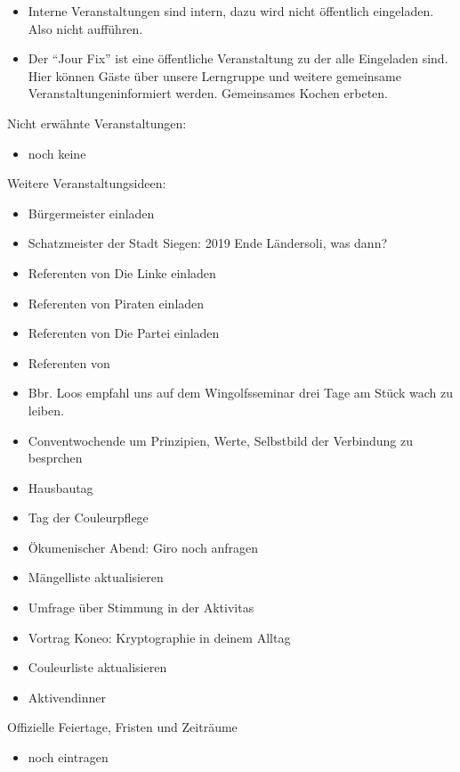%
% 


\begin{itemize}
\item Interne Veranstaltungen sind intern, dazu wird nicht öffentlich eingeladen. Also nicht aufführen.
\item Der \enquote{Jour Fix} ist eine öffentliche Veranstaltung zu der alle Eingeladen sind. Hier können Gäste über unsere Lerngruppe und weitere gemeinsame Veranstaltungeninformiert werden. Gemeinsames Kochen erbeten.
\end{itemize}

Nicht erwähnte Veranstaltungen:
\begin{itemize}
	\item noch keine
\end{itemize}

Weitere Veranstaltungsideen:
\begin{itemize}
	\item Bürgermeister einladen
	\item Schatzmeister der Stadt Siegen: 2019 Ende Ländersoli, was dann?
	\item Referenten von Die Linke einladen
	\item Referenten von Piraten einladen
	\item Referenten von Die Partei einladen
	\item Referenten von 
	\item Bbr. Loos empfahl uns auf dem Wingolfsseminar drei Tage am Stück wach zu leiben. 
	\item Conventwochende um Prinzipien, Werte, Selbstbild der Verbindung zu besprchen
	\item Hausbautag
	\item Tag der Couleurpflege
	\item Ökumenischer Abend: Giro noch anfragen
	\item Mängelliste aktualisieren
	\item Umfrage über Stimmung in der Aktivitas
	\item Vortrag Koneo: Kryptographie in deinem Alltag
	\item Couleurliste aktualisieren
	\item Aktivendinner
\end{itemize}

Offizielle Feiertage, Fristen und Zeiträume
\begin{itemize}
	\item noch eintragen
\end{itemize}